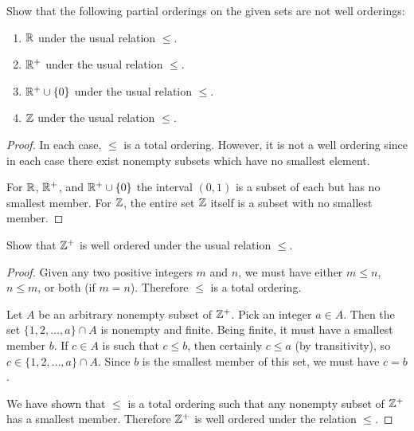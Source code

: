  Show that the following partial orderings on the given sets
are not well orderings:
\begin{enumerate}
\item $\mathbb{R}$ under the usual relation $\leq$.
\item $\mathbb{R}^+$ under the usual relation $\leq$.
\item $\mathbb{R}^+\cup\{0\}$ under the usual relation $\leq$.
\item $\mathbb{Z}$ under the usual relation $\leq$.
\end{enumerate}
\begin{proof}
  In each case, $\leq$ is a total ordering. However, it is not a well
  ordering since in each case there exist nonempty subsets which have
  no smallest element.

  For $\mathbb{R}$, $\mathbb{R}^+$, and $\mathbb{R}^+\cup\{0\}$ the interval $(0,1)$ is a
  subset of each but has no smallest member. For $\mathbb{Z}$, the entire set
  $\mathbb{Z}$ itself is a subset with no smallest member.
\end{proof}

 Show that $\mathbb{Z}^+$ is well ordered under the usual relation
$\leq$.
\begin{proof}
  Given any two positive integers $m$ and $n$, we must have either
  $m\leq n$, $n\leq m$, or both (if $m = n$). Therefore $\leq$ is a
  total ordering.

  Let $A$ be an arbitrary nonempty subset of $\mathbb{Z}^+$. Pick an integer
  $a\in A$. Then the set $\{1,2,\dots,a\}\cap A$ is nonempty and
  finite. Being finite, it must have a smallest member $b$. If
  $c\in A$ is such that $c\leq b$, then certainly $c\leq a$ (by
  transitivity), so $c\in\{1,2,\dots,a\}\cap A$. Since $b$ is the
  smallest member of this set, we must have $c = b$.

  We have shown that $\leq$ is a total ordering such that any nonempty
  subset of $\mathbb{Z}^+$ has a smallest member. Therefore $\mathbb{Z}^+$ is well
  ordered under the relation $\leq$.
\end{proof}
